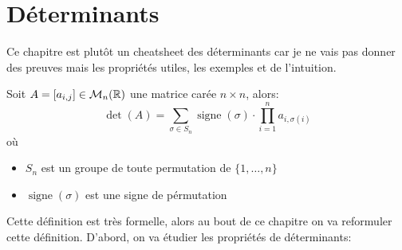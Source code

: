 \chapter{Déterminants}
Ce chapitre est plutôt un cheatsheet des déterminants car je ne vais pas donner des preuves mais les propriétés utiles, les exemples et de l'intuition.

\begin{definition}
    Soit $A = [a_{i, j}] \in \mathcal{M}_{n}(\mathbb{R})$ une matrice carée $n \times n$, alors:
    \[
        \operatorname{det}(A) = \sum_{\sigma \in S_n}^{} \operatorname{signe}(\sigma) \cdot \prod_{i=1}^{n} a_{i, \sigma(i)} 
    \] 
    où 
    \begin{itemize}
        \item $S_n$ est un groupe de toute permutation de  $\{1, \ldots, n\}$
        \item $\operatorname{signe}(\sigma)$ est une signe de pérmutation
    \end{itemize}
\end{definition}

Cette définition est très formelle, alors au bout de ce chapitre on va reformuler cette définition. D'abord, on va étudier les propriétés de déterminants:

